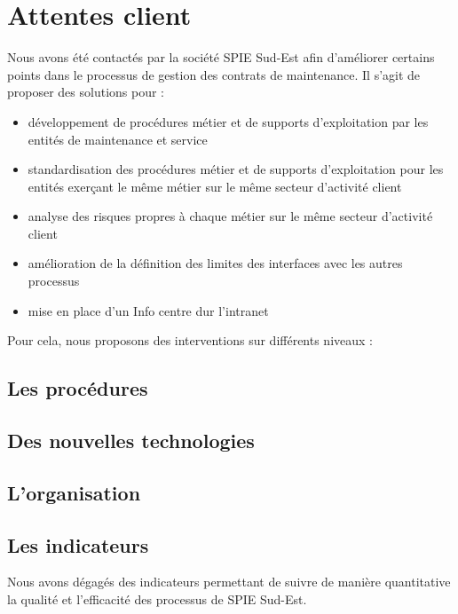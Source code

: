 \chapter{Attentes client}
	Nous avons été contactés par la société SPIE Sud-Est afin d'améliorer certains points dans le processus de gestion des contrats de maintenance. Il s'agit de proposer des solutions pour :

	\begin{itemize}
        \item développement de procédures métier et de supports d'exploitation par les entités de maintenance et service
        \item standardisation des procédures métier et de supports d'exploitation pour les entités exerçant le même métier sur le même secteur d'activité client
        \item analyse des risques propres à chaque métier sur le même secteur d'activité client
        \item amélioration de la définition des limites des interfaces avec les autres processus
        \item mise en place d'un Info centre dur l'intranet
    \end{itemize}

    Pour cela, nous proposons des interventions sur différents niveaux :

    \section{Les procédures}

    \section{Des nouvelles technologies}

    \section{L'organisation}

    \section{Les indicateurs}

        Nous avons dégagés des indicateurs permettant de suivre de manière quantitative la qualité et l'efficacité des processus de SPIE Sud-Est.


